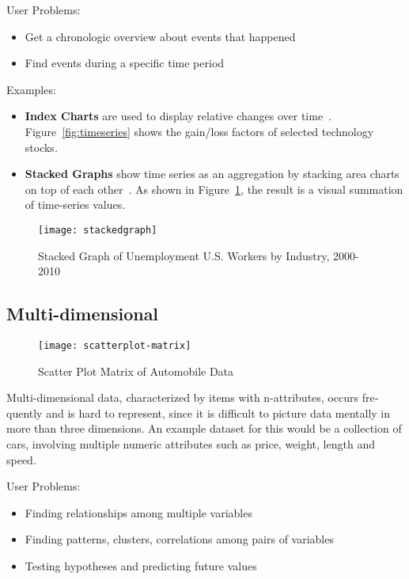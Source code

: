 \begin{english}
\SuperPar User Problems:

\begin{itemize}
\item Get a chronologic overview about events that happened
\item Find events during a specific time period
\end{itemize}

\SuperPar Examples:

\begin{itemize}
\item \textbf{Index Charts} are used to display relative changes over time~\cite{VisualizationZoo:2010}. Figure~\ref{fig:timeseries} shows the gain/loss factors of selected technology stocks.
\item \textbf{Stacked Graphs} show time series as an aggregation by stacking area charts on top of each other~\cite{Byron:2008,VisualizationZoo:2010}. As shown in Figure~\ref{fig:stackedgraph}, the result is a visual summation of time-series values.
\end{itemize}


\begin{figure}
\centering
\texttt{[image: stackedgraph]}
\caption{Stacked Graph of Unemployment U.S. Workers by Industry, 2000-2010}
\label{fig:stackedgraph}
\end{figure}


\subsection{Multi-dimensional}

\begin{figure}
\centering
\texttt{[image: scatterplot-matrix]}
\caption{Scatter Plot Matrix of Automobile Data}
\label{fig:scatterplot-matrix}
\end{figure}

Multi-dimensional data, characterized by items with n-attributes, occurs frequently and is hard to represent, since it is difficult to picture data mentally in more than three dimensions. An example dataset for this would be a collection of cars, involving multiple numeric attributes such as price, weight, length and speed.

\SuperPar User Problems:

\begin{itemize}
  \item Finding relationships among multiple variables
  \item Finding patterns, clusters, correlations among pairs of variables
  \item Testing hypotheses and predicting future values
\end{itemize}


\end{english}
